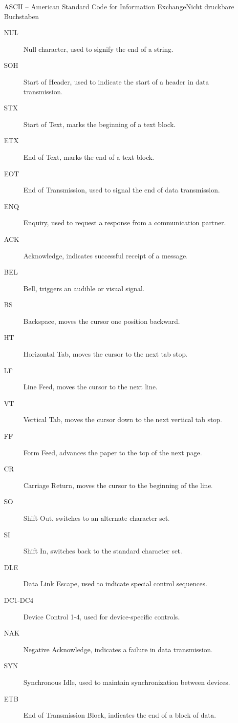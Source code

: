 \documentclass[xelatex,aspectratio=169]{beamer}
\begin{document}
\begin{frame}[allowframebreaks]{ASCII -- American Standard Code for Information Exchange}{Nicht druckbare Buchstaben}
    \begin{description}
        \item[NUL] Null character, used to signify the end of a string.
        \item[SOH] Start of Header, used to indicate the start of a header in data transmission.
        \item[STX] Start of Text, marks the beginning of a text block.
        \item[ETX] End of Text, marks the end of a text block.
        \item[EOT] End of Transmission, used to signal the end of data transmission.
        \item[ENQ] Enquiry, used to request a response from a communication partner.
        \item[ACK] Acknowledge, indicates successful receipt of a message.
        \item[BEL] Bell, triggers an audible or visual signal.
        \item[BS] Backspace, moves the cursor one position backward.
        \item[HT] Horizontal Tab, moves the cursor to the next tab stop.
        \item[LF] Line Feed, moves the cursor to the next line.
        \item[VT] Vertical Tab, moves the cursor down to the next vertical tab stop.
        \item[FF] Form Feed, advances the paper to the top of the next page.
        \item[CR] Carriage Return, moves the cursor to the beginning of the line.
        \item[SO] Shift Out, switches to an alternate character set.
        \item[SI] Shift In, switches back to the standard character set.
        \item[DLE] Data Link Escape, used to indicate special control sequences.
        \item[DC1-DC4] Device Control 1-4, used for device-specific controls.
        \item[NAK] Negative Acknowledge, indicates a failure in data transmission.
        \item[SYN] Synchronous Idle, used to maintain synchronization between devices.
        \item[ETB] End of Transmission Block, indicates the end of a block of data.

\end{description}
\end{frame}
\end{document}
